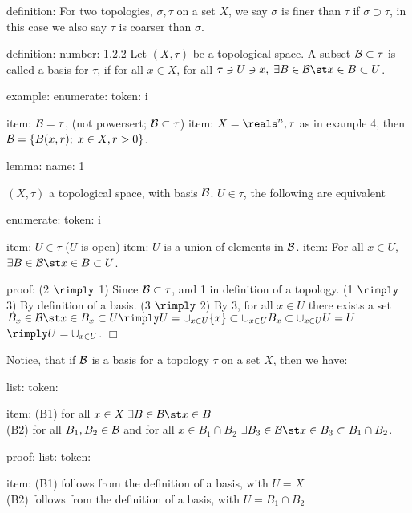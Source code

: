     definition:
        For two topologies, $\sigma, \tau$ on a set $X$, we say $\sigma$ is finer than $\tau$ if $\sigma \supset \tau$, in this case we also say $\tau$ is coarser than $\sigma$.

    definition:
        number:
            1.2.2
        Let $(X, \tau)$ be a topological space. A subset $\mathcal{B} \subset \tau$ is called a basis for $\tau$, if for all $x \in X$, for all $\tau \ni U \ni x, \; \exists B \in \B \st x \in B \subset U$.
    
    example:
        enumerate:
            token:
                i
            
            item:
                $\mathcal{B} = \tau$, (not powersert; $\mathcal{B} \subset \tau$)
            item:
                $X = \reals^n, \tau$ as in example 4, then $\mathcal{B} = \{ B(x, r); \; x \in X, r>0 \}$.
    
    lemma:
        name:
            1
        
        $(X, \tau)$ a topological space, with basis $\mathcal{B}$. $U \in \tau$, the following are equivalent
        
        enumerate:
            token:
                i
            
            item:
                $U \in \tau$ ($U$ is open)
            item:
                $U$ is a union of elements in $\mathcal{B}$.
            item:
                For all $x \in U$, $\exists B \in \B \st x \in B \subset U$.
        
        proof:
            (2 $\rimply$ 1) Since $\mathcal{B} \subset \tau$, and 1 in definition of a topology.
            (1 $\rimply$ 3) By definition of a basis.
            (3 $\rimply$ 2) By 3, for all $x \in U$  there exists a set $B_x \in \B \st x \in B_x \subset U \rimply U = \cup_{x \in U} \{x\} \subset \cup_{x \in U} B_x \subset \cup_{x \in U} U = U $ $\rimply U = \cup_{x \in U}$. $ \Box$
    
    Notice, that if $\mathcal{B}$ is a basis for a topology $\tau$ on a set $X$, then we have:
    
    list:
        token:
            
        item:
            (B1) for all $x \in X \; \exists B \in \B \st x \in B$ \\
            (B2) for all $B_1, B_2 \in \mathcal{B}$ and for all $x \in B_1 \cap B_2$ $\exists B_3 \in \B \st x \in B_3 \subset B_1 \cap B_2$.
    
    proof:
        list:
            token:
                
            item:
                (B1) follows from the definition of a basis, with $U = X$ \\
                (B2) follows from the definition of a basis, with $U = B_1 \cap B_2$
    
